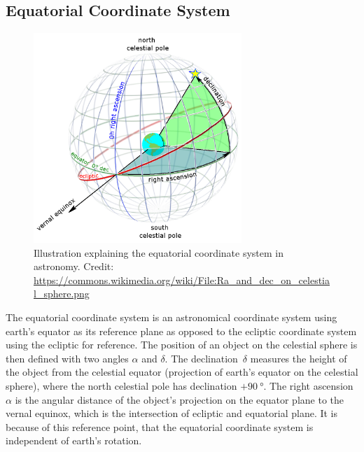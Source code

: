 \documentclass[11pt, a4paper]{article}
\numberwithin{equation}{section}
\begin{document}
\subsection{Equatorial Coordinate System}
\begin{figure}[h]
	\centering
	\includegraphics[width=0.7\textwidth]{./figures/equatorial_cs.png}
	\caption{Illustration explaining the equatorial coordinate system in astronomy. Credit: \url{https://commons.wikimedia.org/wiki/File:Ra_and_dec_on_celestial_sphere.png}}
\end{figure}
The equatorial coordinate system is an astronomical coordinate system using earth's equator as its reference plane as opposed to the ecliptic coordinate system using the ecliptic for reference.
The position of an object on the celestial sphere is then defined with two angles $\alpha$ and $\delta$.
The declination~$\delta$ measures the height of the object from the celestial equator (projection of earth's equator on the celestial sphere), where the north celestial pole has declination $+\SI{90}{\degree}$.
The right ascension $\alpha$ is the angular distance of the object's projection on the equator plane to the vernal equinox, which is the intersection of ecliptic and equatorial plane.
It is because of this reference point, that the equatorial coordinate system is independent of earth's rotation.
\end{document}
